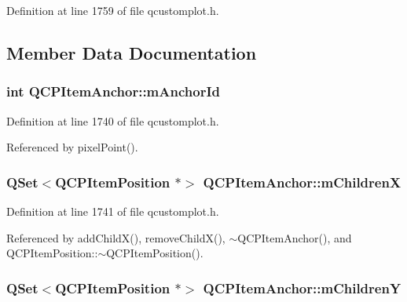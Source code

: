 Definition at line 1759 of file qcustomplot.\+h.



\subsection{Member Data Documentation}
\hypertarget{class_q_c_p_item_anchor_a00c62070333e8345976b579676ad3997}{}
\subsubsection[{m\+Anchor\+Id}]{\setlength{\rightskip}{0pt plus 5cm}int Q\+C\+P\+Item\+Anchor\+::m\+Anchor\+Id\hspace{0.3cm}{\ttfamily [protected]}}\label{class_q_c_p_item_anchor_a00c62070333e8345976b579676ad3997}


Definition at line 1740 of file qcustomplot.\+h.



Referenced by pixel\+Point().

\hypertarget{class_q_c_p_item_anchor_ab8fd931923357898286ae604e1380fa7}{}
\subsubsection[{m\+Children\+X}]{\setlength{\rightskip}{0pt plus 5cm}Q\+Set$<${\bf Q\+C\+P\+Item\+Position} $\ast$$>$ Q\+C\+P\+Item\+Anchor\+::m\+Children\+X\hspace{0.3cm}{\ttfamily [protected]}}\label{class_q_c_p_item_anchor_ab8fd931923357898286ae604e1380fa7}


Definition at line 1741 of file qcustomplot.\+h.



Referenced by add\+Child\+X(), remove\+Child\+X(), $\sim$\+Q\+C\+P\+Item\+Anchor(), and Q\+C\+P\+Item\+Position\+::$\sim$\+Q\+C\+P\+Item\+Position().

\hypertarget{class_q_c_p_item_anchor_a6d58eb782eda4d96a95067354305b139}{}
\subsubsection[{m\+Children\+Y}]{\setlength{\rightskip}{0pt plus 5cm}Q\+Set$<${\bf Q\+C\+P\+Item\+Position} $\ast$$>$ Q\+C\+P\+Item\+Anchor\+::m\+Children\+Y\hspace{0.3cm}{\ttfamily [protected]}}\label{class_q_c_p_item_anchor_a6d58eb782eda4d96a95067354305b139}


